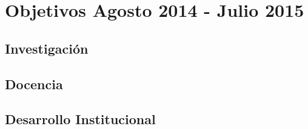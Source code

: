 \documentclass{article}
\begin{document}
\newpage
\section{Objetivos Agosto 2014 - Julio 2015}
\subsection{Investigaci\'on}

\subsection{Docencia}

\subsection{Desarrollo Institucional}
\end{document}
